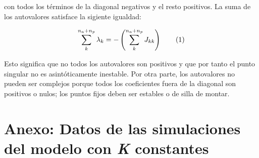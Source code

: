 \noindent con todos los términos de la diagonal negativos y el resto positivos. La suma de los autovalores satisface la sigiente igualdad:

\begin{equation}
  \sum_{k}^{n_{a}+n_{p}} \lambda_{k}= -\left(\sum_{k}^{n_{a}+n_{p}} J_{kk}\right)
  \stepcounter{equation}\tag{\theequation}\label{eq:sum_lambdas}
\end{equation}

Esto significa que no todos los autovalores son positivos y que por tanto el punto singular no es asintóticamente inestable. Por otra parte, los autovalores no pueden ser complejos porque todos los coeficientes fuera de la diagonal son positivos o nulos; los puntos fijos deben ser estables o de silla de montar.

\clearpage
\section{Anexo: Datos de las simulaciones del modelo con \textit{K} constantes}
\label{DINAMICA_ANEXO_KConst}

